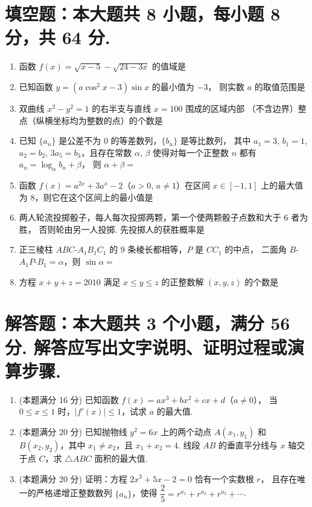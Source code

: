 \documentclass{chsmc}
\begin{document}
\section{填空题：本大题共 8 小题，每小题 8 分，共 64 分.}

\begin{enumerate}
	\item 函数 $f(x) = \sqrt{x-5} - \sqrt{24-3x}$ 的值域是 \blankline
	\item 已知函数 $y = (a\cos^2 x - 3)\sin x$ 的最小值为 $-3$，
		则实数 $a$ 的取值范围是 \blankline
	\item 双曲线 $x^2-y^2=1$ 的右半支与直线 $x=100$ 围成的区域内部
		（不含边界）整点（纵横坐标均为整数的点）的个数是 \blankline
	\item 已知 $\{a_n\}$ 是公差不为 $0$ 的等差数列，$\{b_n\}$ 是等比数列，
		其中 $a_1 = 3$, $b_1 = 1$, $a_2 = b_2$, $3a_5 = b_3$，且存在常数 $\alpha$, $\beta$
		使得对每一个正整数 $n$ 都有 $a_n = \log_{\alpha} b_n + \beta$，
		则 $\alpha + \beta =$ \blankline
	\item 函数 $f(x) = a^{2x} + 3a^x - 2$（$a > 0$, $a \neq 1$）在区间
		$x\in[-1,1]$ 上的最大值为 $8$，则它在这个区间上的最小值是 \blankline
	\item 两人轮流投掷骰子，每人每次投掷两颗，第一个使两颗骰子点数和大于 $6$ 者为胜，
		否则轮由另一人投掷. 先投掷人的获胜概率是 \blankline
	\item 正三棱柱 $ABC$-$A_1B_1C_1$ 的 $9$ 条棱长都相等，$P$ 是 $CC_1$ 的中点，
		二面角 $B$-$A_1P$-$B_1 = \alpha$，则 $\sin\alpha =$ \blankline
	\item 方程 $x + y + z = 2010$ 满足 $x \leqslant y \leqslant z$ 的正整数解
		$(x,y,z)$ 的个数是 \blankline
\end{enumerate}

\section{解答题：本大题共 3 个小题，满分 56 分. 解答应写出文字说明、证明过程或演算步骤.}

\begin{enumerate}[resume]
	\item (本题满分 16 分) 已知函数 $f(x) = ax^3 + bx^2 + cx + d$（$a \neq 0$），
		当 $0 \leqslant x \leqslant 1$ 时，$|f'(x)| \leqslant 1$，试求 $a$ 的最大值.
	\item (本题满分 20 分) 已知抛物线 $y^2 = 6x$ 上的两个动点
		$A(x_1,y_1)$ 和 $B(x_2,y_2)$，其中 $x_1 \neq x_2$，且 $x_1 + x_2 = 4$.
		线段 $AB$ 的垂直平分线与 $x$ 轴交于点 $C$，求 $\triangle ABC$ 面积的最大值.
	\item (本题满分 20 分) 证明：方程 $2x^3 + 5x - 2 = 0$ 恰有一个实数根 $r$，
		且存在唯一的严格递增正整数数列 $\{a_n\}$，使得
		$\dfrac{2}{5} = r^{a_1} + r^{a_2} + r^{a_3} + \cdots$.
\end{enumerate}
\end{document}
